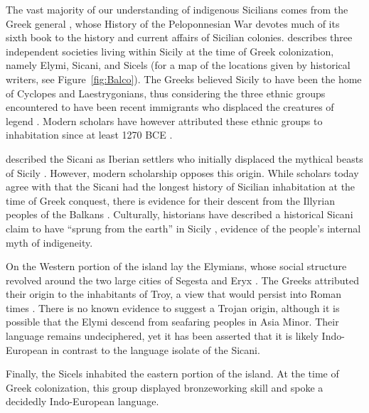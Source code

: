 \documentclass[american]{../../../coursework}
\begin{document}
The vast majority of our understanding of indigenous Sicilians comes from the
Greek general \citeauthor{Thucydides}, whose History of the Peloponnesian War
devotes much of its sixth book to the history and current affairs of Sicilian
colonies. \citeauthor{Thucydides} describes three independent societies living
within Sicily at the time of Greek colonization, namely Elymi, Sicani, and
Sicels (for a map of the locations given by historical writers, see
Figure~\ref{fig:Balco}). The Greeks believed Sicily to have been the home of
Cyclopes and Laestrygonians, thus considering the three ethnic groups
encountered to have been recent immigrants who displaced the creatures of
legend \parencite[VI.2]{Thucydides}. Modern scholars have however attributed
these ethnic groups to inhabitation since at least 1270 BCE \parencite{Lei99}.

\citeauthor{Thucydides} described the Sicani as Iberian settlers who initially
displaced the mythical beasts of Sicily \parencite[VI.2]{Thucydides}. However,
modern scholarship opposes this origin. While scholars today agree with
\citeauthor{Thucydides} that the Sicani had the longest history of Sicilian
inhabitation at the time of Greek conquest, there is evidence for their
descent from the Illyrian peoples of the Balkans \parencite{Fin83}.
Culturally, historians have described a historical Sicani claim to have
``sprung from the earth'' in Sicily \parencite[12]{Fre92}, evidence of the
people's internal myth of indigeneity.

On the Western portion of the island lay the Elymians, whose social structure
revolved around the two large cities of Segesta and Eryx
\parencite[VI.2]{Thucydides}. The Greeks attributed their origin to the
inhabitants of Troy, a view that would persist into Roman times
\parencite{Fre92}. There is no known evidence to suggest a Trojan origin,
although it is possible that the Elymi descend from seafaring peoples in Asia
Minor. Their language remains undeciphered, yet it has been asserted that it
is likely Indo-European \parencite{Mar12} in contrast to the language isolate
of the Sicani.

Finally, the Sicels inhabited the eastern portion of the island. At the time
of Greek colonization, this group displayed bronzeworking skill and spoke a
decidedly Indo-European language.
\end{document}
